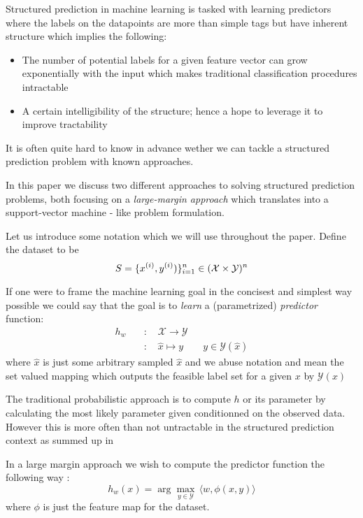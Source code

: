 Structured prediction in machine learning is tasked with learning
predictors where the labels on the datapoints are more than simple
tags but have inherent structure which implies the following:
\begin{itemize}
\item The number of potential labels for a given feature vector
  can grow exponentially with the input which makes traditional
  classification procedures intractable
\item A certain intelligibility of the structure; hence a hope to
  leverage it to improve tractability
\end{itemize}
It is often quite hard to know in advance wether we can tackle a structured
prediction problem with known approaches.

In this paper we discuss two different approaches to solving structured
prediction problems, both focusing on a \emph{large-margin approach} which
translates into a support-vector machine - like problem formulation.

Let us introduce some notation which we will use throughout the paper.
Define the dataset to be
\begin{equation}
  S = \{ x^{(i)}, y^{(i)}) \}_{i=1}^{n} \in (\mathcal X \times \mathcal Y)^{n} \label{intro:eq:dataset}
\end{equation}

If one were to frame the machine learning goal in the concisest and simplest way
possible we could say that the goal is to \emph{learn} a (parametrized) \emph{predictor}
function:
\begin{align*}
  h_w \quad & : \quad  \mathcal{X} \rightarrow \mathcal Y\\
  &: \quad \hat x \mapsto y \qquad y\in \mathcal{Y} (\hat x)
\end{align*}
where $\hat x$ is just some arbitrary sampled $\hat x$ and we abuse notation and mean
the set valued mapping which outputs the feasible label set for a given $x$ by
$\mathcal Y(x)$

The traditional probabilistic approach is to compute $h$ or its parameter by
calculating the most likely parameter given conditionned on the observed data.
However this is more often than not untractable in the structured prediction
context as summed up in \citet{taskarStructuredPredictionDual2006}

In a large margin approach we wish to compute the predictor
function the following way :
\begin{equation}
  h_{w}(x)= \arg\max_{y\in \mathcal Y} \, \langle w, \phi(x,y)\rangle
\end{equation}
where $\phi$ is just the feature map for the dataset.


